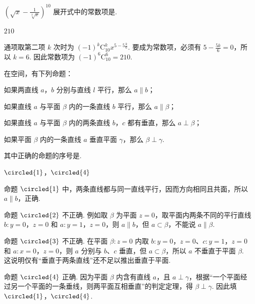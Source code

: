 \begin{problem}
\(\left(\sqrt{x}-\frac{1}{\sqrt[3]{x}}\right)^{10}\) 展开式中的常数项是\fillinblank{}.
\end{problem}

\begin{answer}
\(210\)
\end{answer}

\begin{solution}
通项取第二项 \(k\) 次时为 \((-1)^{k}\mathrm C_{10}^{k}x^{5-5\frac{k}{6}}\). 要成为常数项，必须有 \(5-\frac{5k}{6}=0\)，所以 \(k=6\). 因此常数项为 \((-1)^{6}\mathrm C_{10}^{6}=210\).
\end{solution}

\begin{problem}
在空间，有下列命题：

\begin{circlelist}
\item 如果两直线 \(a\)，\(b\) 分别与直线 \(l\) 平行，那么 \(a\parallel b\)；
\item 如果直线 \(a\) 与平面 \(\beta\) 内的一条直线 \(b\) 平行，那么 \(a\parallel\beta\)；
\item 如果直线 \(a\) 与平面 \(\beta\) 内的两条直线 \(b\)，\(c\) 都有垂直，那么 \(a\perp\beta\)；
\item 如果平面 \(\beta\) 内的一条直线 \(a\) 垂直平面 \(\gamma\)，那么 \(\beta\perp\gamma\).
\end{circlelist}

其中正确的命题的序号是\fillinblank{}.
\end{problem}

\begin{answer}
\(\circled{1}\)，\(\circled{4}\)
\end{answer}

\begin{solution}
命题 \(\circled{1}\) 中，两条直线都与同一直线平行，因而方向相同且共面，所以 \(a\parallel b\)，正确.

命题 \(\circled{2}\) 不正确. 例如取 \(\beta\) 为平面 \(z=0\)，取平面内两条不同的平行直线 \(b:y=0\)，\(z=0\) 和 \(a:y=1\)，\(z=0\)，则 \(a\parallel b\)，但 \(a\subset\beta\)，不能说 \(a\parallel\beta\).

命题 \(\circled{3}\) 不正确. 在平面 \(\beta:z=0\) 内取 \(b:y=0\)，\(z=0\)、\(c:y=1\)，\(z=0\) 和 \(a:x=0\)，\(z=0\)，则 \(a\) 分别与 \(b\)、\(c\) 垂直，但 \(a\subset\beta\)，所以 \(a\) 不垂直于平面 \(\beta\). 这说明仅有“垂直于两条直线”还不足以推出垂直于平面.

命题 \(\circled{4}\) 正确. 因为平面 \(\beta\) 内含有直线 \(a\)，且 \(a\perp\gamma\)，根据“一个平面经过另一个平面的一条垂线，则两平面互相垂直”的判定定理，得 \(\beta\perp\gamma\). 因此填 \(\circled{1}\)，\(\circled{4}\).
\end{solution}

